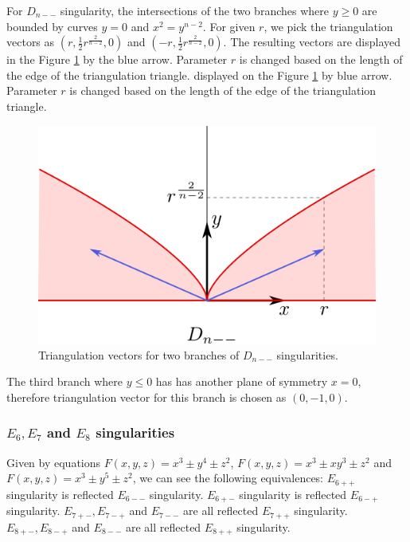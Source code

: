 For $D_{n--}$ singularity, the intersections of the two branches where
$y \geq 0$ are bounded by curves $y=0$ and $x^2=y^{n-2}$. For given $r$,
we pick the triangulation vectors as $(r, \frac{1}{2}r^{\frac{2}{n-2}}, 0)$
and $(-r, \frac{1}{2}r^{\frac{2}{n-2}}, 0)$. The resulting vectors are
displayed in the Figure \ref{img:9} by the blue arrow. Parameter $r$ is changed based
on the length of the edge of the triangulation triangle.
displayed on the Figure \ref{img:9} by blue arrow. Parameter $r$ is changed based
on the length of the edge of the triangulation triangle.

\begin{figure}
    \centerline{\includegraphics[scale=0.5]{images/img9}}
    \caption[Triangulation vectors for two branches of $D_{n--}$ singularities.]
    {Triangulation vectors for two branches of $D_{n--}$ singularities.}
    \label{img:9}
\end{figure}

The third branch where $y\leq0$ has has another plane of symmetry $x=0$,
therefore triangulation vector for this branch is chosen as $(0, -1, 0)$.

\subsubsection*{$E_6, E_7$ and $E_8$ singularities}

Given by equations $F(x,y,z)=x^3\pm y^4\pm z^2$, $F(x,y,z)=x^3\pm xy^3\pm z^2$
and $F(x,y,z)=x^3\pm y^5\pm z^2$, we can see the following equivalences:
$E_{6++}$ singularity is reflected $E_{6--}$ singularity.
$E_{6+-}$ singularity is reflected $E_{6-+}$ singularity.
$E_{7+-}, E_{7-+}$ and $E_{7--}$ are all reflected $E_{7++}$ singularity.
$E_{8+-}, E_{8-+}$ and $E_{8--}$ are all reflected $E_{8++}$ singularity.

